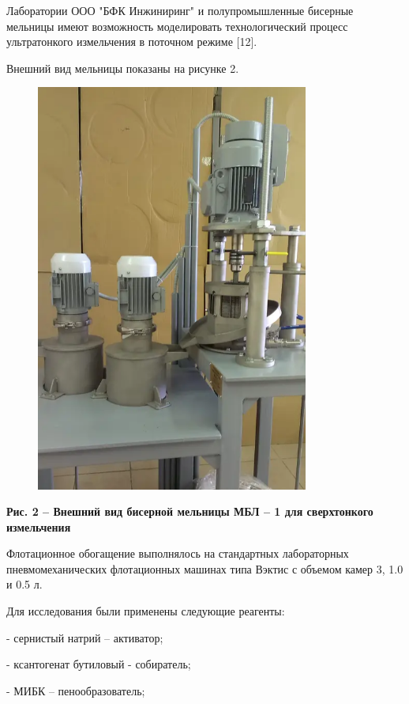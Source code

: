 Лаборатории ООО "БФК Инжиниринг" и полупромышленные бисерные мельницы
имеют возможность моделировать технологический процесс ультратонкого
измельчения в поточном режиме {[}12{]}.

Внешний вид мельницы показаны на рисунке 2.

\begin{figure}[H]
	\centering
	\includegraphics[width=0.8\textwidth]{assets/300}
	\caption*{}
\end{figure}

{\bfseries Рис. 2 -- Внешний вид бисерной мельницы МБЛ -- 1 для
сверхтонкого измельчения}

Флотационное обогащение выполнялось на стандартных лабораторных
пневмомеханических флотационных машинах типа Вэктис с объемом камер 3,
1.0 и 0.5 л.

Для исследования были применены следующие реагенты:

- сернистый натрий -- активатор;

- ксантогенат бутиловый - собиратель;

- МИБК -- пенообразователь;

